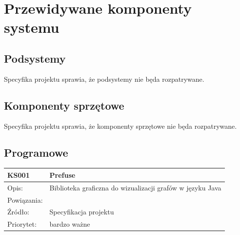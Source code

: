 \documentclass[a4paper,10pt]{article}
\begin{document}



\section{Przewidywane komponenty systemu}


\subsection{Podsystemy}
Specyfika projektu sprawia, że podsystemy nie będa rozpatrywane.

\subsection{Komponenty sprzętowe}
Specyfika projektu sprawia, że komponenty sprzętowe nie będa rozpatrywane. 

\subsection{Programowe}

\begin{center}
\begin{tabular}{|m{3cm}|m{9cm}|} \hline

KS001 & Prefuse \\ \hline
Opis: &  Biblioteka graficzna do wizualizacji grafów w języku Java\\ \hline
Powiązania: &  \\ \hline
Źródło: & Specyfikacja projektu \\ \hline
Priorytet: & bardzo ważne \\ \hline

\end{tabular}
\end{center}
\end{document}
